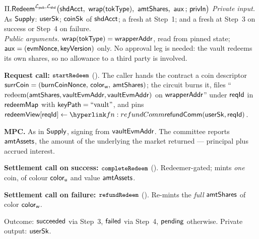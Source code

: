 \begin{ProcBox}{$\Pi.\Redeem^{\Lpub, \Lshd}\bigl(\shdAcct\bc \wrapOf{\tokType}\bc \amtShares\bc
      \auxx \,;\, \privIn\bigr)$}
\label{box:redeem}
\sloppy
\emph{Private input.} As $\mathsf{Supply}$: $\mathsf{userSk}$; $\mathsf{coinSk}$ of $\mathsf{shdAcct}$; a fresh
\freshrn{$\burnNonce$} at Step~1; and a fresh \freshrn{$\mintNonce$} at Step~3 on success or Step~4
on failure.\\
\emph{Public arguments.} $\mathsf{wrap}(\mathsf{tokType}) = \mathsf{wrapperAddr}$, read from pinned state;
$\mathsf{aux} = (\mathsf{evmNonce}, \mathsf{keyVersion})$ only. No approval leg is needed: the vault redeems its own shares,
so no allowance to a third party is involved.

\begin{Steps}
\item \textbf{Request call: $\texttt{\small startRedeem}$} (). The caller hands the contract a coin
      descriptor $\mathsf{surrCoin} = (\mathsf{burnCoinNonce},\, \mathsf{color}_{\mathsf{w}},\, \mathsf{amtShares})$; the circuit burns it, files
      ``$\text{redeem}(\mathsf{amtShares}, \mathsf{vaultEvmAddr}, \mathsf{vaultEvmAddr})$ on $\mathsf{wrapperAddr}$'' under $\mathsf{reqId}$ in
      $\mathsf{redeemMap}$ with $\mathsf{keyPath} = \text{``vault''}$, and pins
      $\redeemMarkerMap[\rid] \gets \lnk{fn:refundComm}{\refundComm(\usersk, \rid)}$.
\item \textbf{MPC.} As in $\mathsf{Supply}$, signing from $\mathsf{vaultEvmAddr}$. The committee reports
      $\mathsf{amtAssets}$, the amount of the underlying the market returned --- principal plus accrued
      interest.
\item \textbf{Settlement call on success: $\texttt{\small completeRedeem}$} ().
      Redeemer-gated; mints \emph{one} coin, of colour $\mathsf{color}_{\mathsf{u}}$ and value $\mathsf{amtAssets}$.
\item \textbf{Settlement call on failure: $\texttt{\small refundRedeem}$}
      (). Re-mints the \emph{full} $\mathsf{amtShares}$ of color $\mathsf{color}_{\mathsf{w}}$.
\end{Steps}

\medskip
Outcome: $\mathsf{succeeded}$ via Step~3, $\mathsf{failed}$ via Step~4, $\mathsf{pending}$ otherwise. Private output:
$\mathsf{userSk}$.
\end{ProcBox}

